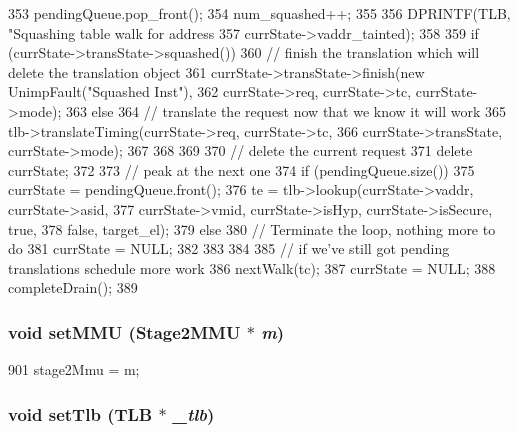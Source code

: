 \begin{DoxyCode}
{{353         pendingQueue.pop_front();
354         num_squashed++;
355 
356         DPRINTF(TLB, "Squashing table walk for address %
357                       currState->vaddr_tainted);
358 
359         if (currState->transState->squashed()) {
360             // finish the translation which will delete the translation object
361             currState->transState->finish(new UnimpFault("Squashed Inst"),
362                     currState->req, currState->tc, currState->mode);
363         } else {
364             // translate the request now that we know it will work
365             tlb->translateTiming(currState->req, currState->tc,
366                         currState->transState, currState->mode);
367 
368         }
369 
370         // delete the current request
371         delete currState;
372 
373         // peak at the next one
374         if (pendingQueue.size()) {
375             currState = pendingQueue.front();
376             te = tlb->lookup(currState->vaddr, currState->asid,
377                 currState->vmid, currState->isHyp, currState->isSecure, true,
378                 false, target_el);
379         } else {
380             // Terminate the loop, nothing more to do
381             currState = NULL;
382         }
383     }
384 
385     // if we've still got pending translations schedule more work
386     nextWalk(tc);
387     currState = NULL;
388     completeDrain();
389 }
\end{DoxyCode}
\hypertarget{classArmISA_1_1TableWalker_ae888fc9d1a9bad8784469601dcf8d436}{
\subsubsection[{setMMU}]{\setlength{\rightskip}{0pt plus 5cm}void setMMU ({\bf Stage2MMU} $\ast$ {\em m})}}
\label{classArmISA_1_1TableWalker_ae888fc9d1a9bad8784469601dcf8d436}



\begin{DoxyCode}
901 { stage2Mmu = m; }
\end{DoxyCode}
\hypertarget{classArmISA_1_1TableWalker_a0a70f006e7adf20d47920ac6286a2bcb}{
\subsubsection[{setTlb}]{\setlength{\rightskip}{0pt plus 5cm}void setTlb ({\bf TLB} $\ast$ {\em \_\-tlb})}}
\label{classArmISA_1_1TableWalker_a0a70f006e7adf20d47920ac6286a2bcb}



